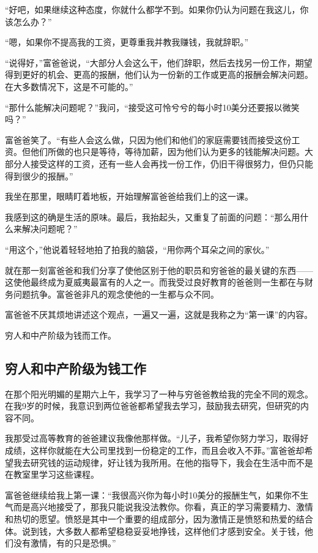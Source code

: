 “好吧，如果继续这种态度，你就什么都学不到。如果你仍认为问题在我这儿，你该怎么办？”

“嗯，如果你不提高我的工资，更尊重我并教我赚钱，我就辞职。”

“说得好，”富爸爸说，“大部分人会这么干，他们辞职，然后去找另一份工作，期望得到更好的机会、更高的报酬，他们认为一份新的工作或更高的报酬会解决问题。在大多数情况下，这是不可能的。”

“那什么能解决问题呢？”我问，“接受这可怜兮兮的每小时10美分还要报以微笑吗？”

富爸爸笑了。“有些人会这么做，只因为他们和他们的家庭需要钱而接受这份工资。但他们所做的也只是等待，等待加薪，因为他们认为更多的钱能解决问题。大部分人接受这样的工资，还有一些人会再找一份工作，仍旧干得很努力，但仍只能得到很少的报酬。”

我坐在那里，眼睛盯着地板，开始理解富爸爸给我们上的这一课。

我感到这的确是生活的原味。最后，我抬起头，又重复了前面的问题：“那么用什么来解决问题呢？”

“用这个，”他说着轻轻地拍了拍我的脑袋，“用你两个耳朵之间的家伙。”

就在那一刻富爸爸和我们分享了使他区别于他的职员和穷爸爸的最关键的东西——这使他最终成为夏威夷最富有的人之一。而我受过良好教育的爸爸则一生都在与财务问题抗争。富爸爸非凡的观念使他的一生都与众不同。

富爸爸不厌其烦地讲述这个观点，一遍又一遍，这就是我称之为“第一课”的内容。

穷人和中产阶级为钱而工作。

\subsection*{穷人和中产阶级为钱工作}

在那个阳光明媚的星期六上午，我学习了一种与穷爸爸教给我的完全不同的观念。在我9岁的时候，我意识到两位爸爸都希望我去学习，鼓励我去研究，但研究的内容不同。

我那受过高等教育的爸爸建议我像他那样做。“儿子，我希望你努力学习，取得好成绩，这样你就能在大公司里找到一份稳定的工作，而且会收入不菲。”富爸爸却希望我去研究钱的运动规律，好让钱为我所用。在他的指导下，我会在生活中而不是在教室里学习这些课程。

富爸爸继续给我上第一课：“我很高兴你为每小时10美分的报酬生气，如果你不生气而是高兴地接受了，那我只能说我没法教你。你看，真正的学习需要精力、激情和热切的愿望。愤怒是其中一个重要的组成部分，因为激情正是愤怒和热爱的结合体。说到钱，大多数人都希望稳稳妥妥地挣钱，这样他们才感到安全。关于钱，他们没有激情，有的只是恐惧。”

